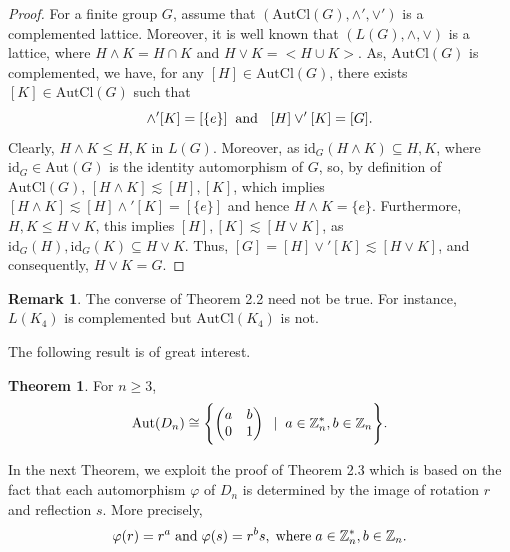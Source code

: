 \documentclass{article}
\theoremstyle{definition}
\newtheorem{theorem}{Theorem}[section]
\newtheorem{remark}{Remark}
\begin{document}
  \begin{proof} For a finite group $G$, assume that $(\text{AutCl}(G), \wedge',\vee')$ is a complemented lattice. Moreover, it is well known that $(L(G), \wedge,\vee)$ is a lattice, where $H\wedge K=H\cap K$ and $H\vee K=\bigl<H\cup K\bigr>$. As, $\text{AutCl}(G)$ is complemented, we have, for any $[H]\in \text{AutCl}(G)$, there exists $[K]\in \text{AutCl}(G)$ such that \begin{equation*}
    [H]\wedge'[K]=[\{e\}]\hspace{0.2cm} \text{and }\hspace{0.2cm} [H]\vee'[K]=[G].
\end{equation*}
Clearly, $H\wedge K\leq H,K$ in $L(G)$. Moreover, as $\text{id}_G(H\wedge K) \subseteq H, K $, where $\text{id}_G\in \text{Aut}(G)$ is the identity automorphism of $G$, so, by definition of $\text{AutCl}(G)$, $[H\wedge K]\lesssim [H],[K]$, which implies $[H\wedge K]\lesssim [H]\wedge'[K]=[\{e\}]$ and hence $H\wedge K=\{e\}$. Furthermore, $H,K\leq H\vee K$, this implies $[H],[K]\lesssim[H\vee K]$, as $\text{id}_G(H),\text{id}_G(K)\subseteq H\vee K$. Thus, $[G]=[H]\vee'[K]\lesssim[H\vee K]$, and consequently, $H\vee K=G$. \end{proof}
\begin{remark}
    The converse of Theorem 2.2 need not be true. For instance, $L(K_4)$ is complemented but $\text{AutCl}(K_4)$ is not.
    \end{remark}
The following result is of great interest.
\begin{theorem}
    \cite{conrad} For $n\ge 3$, \begin{equation*}
    \text{Aut}(D_n) \cong \Biggl\{\begin{pmatrix}
    a & b \\0 & 1
    \end{pmatrix}
    \hspace{0.2cm}|\hspace{0.2cm} a \in \mathbb{Z}_{n}^* , b\in \mathbb{Z}_n \Biggr\}.
\end{equation*}
\end{theorem}
In the next Theorem, we exploit the proof of Theorem 2.3  which is based on the fact that each automorphism $\varphi$ of $D_n$ is determined by the image of rotation $r$ and reflection $s$. More precisely, \begin{equation*}
    \varphi(r)=r^a \hspace{0.1cm}\text{and}\hspace{0.1cm} \varphi(s)=r^bs,\hspace{0.1cm} \text{where} \hspace{0.1cm} a\in \mathbb{Z}_n^*, b \in \mathbb{Z}_n.
    \end{equation*}
\end{document}
